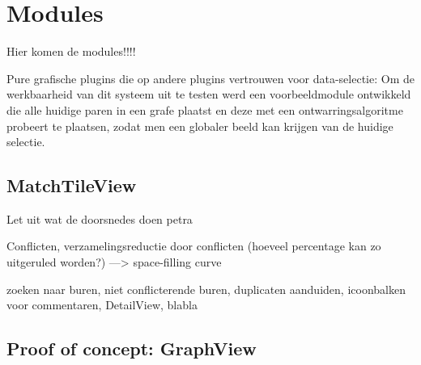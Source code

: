 \chapter{Modules}
\label{hoofdstuk:modules}

Hier komen de modules!!!!

Pure grafische plugins die op andere plugins vertrouwen voor data-selectie: Om de werkbaarheid van dit systeem uit te testen werd een voorbeeldmodule ontwikkeld die alle huidige paren in een grafe plaatst en deze met een ontwarringsalgoritme probeert te plaatsen, zodat men een globaler beeld kan krijgen van de huidige selectie.

\section{MatchTileView}

Let uit wat de doorsnedes doen petra~\cite{Brown2010}

Conflicten, verzamelingsreductie door conflicten (hoeveel percentage kan zo uitgeruled worden?) ---> space-filling curve

zoeken naar buren, niet conflicterende buren, duplicaten aanduiden, icoonbalken voor commentaren, DetailView, blabla

\section{Proof of concept: GraphView}